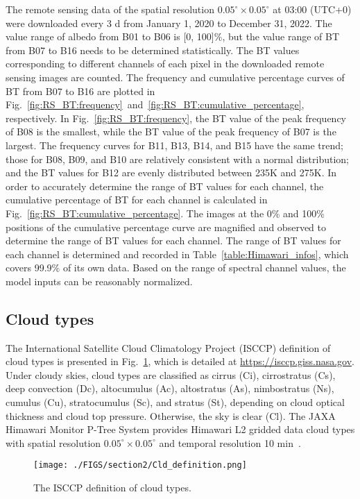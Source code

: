 \documentclass[review]{elsarticle}
\begin{document}
The remote sensing data of the spatial resolution $0.05^{\circ}\times0.05^{\circ}$ at 03:00 (UTC+0) were downloaded every 3 d from January 1, 2020 to December 31, 2022.
The value range of albedo from B01 to B06 is [0, 100]\%, but the value range of BT from B07 to B16 needs to be determined statistically.
The BT values corresponding to different channels of each pixel in the downloaded remote sensing images are counted.
The frequency and cumulative percentage curves of BT from B07 to B16 are plotted in Fig.~\ref{fig:RS_BT:frequency}~and~\ref{fig:RS_BT:cumulative_percentage}, respectively.
In Fig.~\ref{fig:RS_BT:frequency}, the BT value of the peak frequency of B08 is the smallest, while the BT value of the peak frequency of B07 is the largest.
The frequency curves for B11, B13, B14, and B15 have the same trend; those for B08, B09, and B10 are relatively consistent with a normal distribution; and the BT values for B12 are evenly distributed between 235K and 275K.
In order to accurately determine the range of BT values for each channel, the cumulative percentage of BT for each channel is calculated in Fig.~\ref{fig:RS_BT:cumulative_percentage}.
The images at the 0\% and 100\% positions of the cumulative percentage curve are magnified and observed to determine the range of BT values for each channel.
The range of BT values for each channel is determined and recorded in Table~\ref{table:Himawari_infos}, which covers 99.9\% of its own data.
Based on the range of spectral channel values, the model inputs can be reasonably normalized.


\subsection{Cloud types}
\label{section:Cloud}
The International Satellite Cloud Climatology Project (ISCCP) definition of cloud types is presented in Fig.~\ref{fig:Cld_definition}, which is detailed at \href{https://isccp.giss.nasa.gov}{https://isccp.giss.nasa.gov}.
Under cloudy skies, cloud types are classified as cirrus (Ci), cirrostratus (Cs), deep convection (Dc), altocumulus (Ac), altostratus (As), nimbostratus (Ns), cumulus (Cu), stratocumulus (Sc), and stratus (St), depending on cloud optical thickness and cloud top pressure.
Otherwise, the sky is clear (Cl).
The JAXA Himawari Monitor P-Tree System provides Himawari L2 gridded data cloud types with spatial resolution $0.05^{\circ}\times0.05^{\circ}$ and temporal resolution 10 min~\citep{Letu8579544, Lai11141703, LETU2020111583}.

\begin{figure}[!htp]
    \vspace{10mm}
    \centering
    \texttt{[image: ./FIGS/section2/Cld\_definition.png]}
    \caption{The ISCCP definition of cloud types.}
    \label{fig:Cld_definition}
\end{figure}
\end{document}
